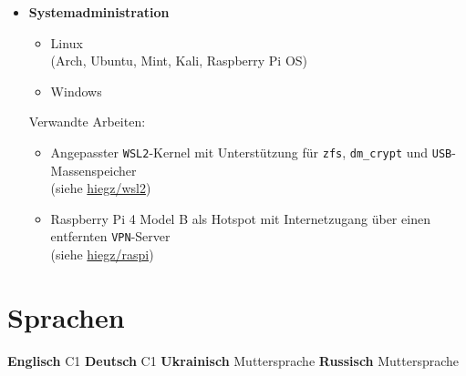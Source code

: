 \documentclass[]{article}
\begin{document}
\begin{minipage}[t]{0.49\linewidth}
    \begin{itemize}[leftmargin=0.15in, rightmargin=0.15in, label={}]
        \item {\large\bfseries Systemadministration}

            \begin{itemize}
                \item Linux \\ (Arch, Ubuntu, Mint, Kali, Raspberry Pi OS)
                \item Windows
            \end{itemize}
            Verwandte Arbeiten:
            \begin{itemize}
                \item Angepasster \verb|WSL2|-Kernel mit Unterstützung für \verb|zfs|, \verb|dm_crypt| und \verb|USB|-Massenspeicher \\ 
                    (siehe \href{https://github.com/hiegz/wsl2}{\ttfamily hiegz/wsl2})
                \item Raspberry Pi 4 Model B als Hotspot mit Internetzugang über einen entfernten \verb|VPN|-Server \\
                    (siehe \href{https://github.com/hiegz/raspi}{\ttfamily hiegz/raspi})
            \end{itemize}
    \end{itemize}
\end{minipage}

\vspace{5pt}
\section{Sprachen}

\hspace{0.15in}
\textbf{Englisch} \: C1 \hspace{20pt} \textbf{Deutsch} \: C1 \hspace{20pt} \textbf{Ukrainisch} \: Muttersprache \hspace{20pt} \textbf{Russisch} \: Muttersprache
\end{document}
